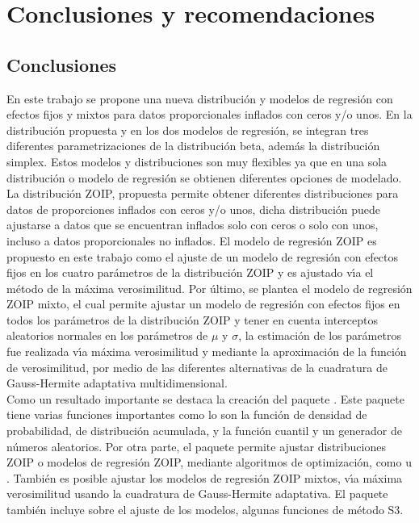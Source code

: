\chapter{Conclusiones y recomendaciones}\label{cap5}
\section{Conclusiones}

En este trabajo se propone una nueva distribuci\'{o}n y modelos de regresi\'{o}n con efectos fijos y mixtos para datos proporcionales inflados con ceros y/o unos. En la distribuci\'{o}n propuesta y en los dos modelos de regresi\'{o}n, se integran tres diferentes parametrizaciones de la distribuci\'{o}n beta, adem\'{a}s la distribuci\'{o}n simplex. Estos modelos y distribuciones son muy flexibles ya que en una sola distribuci\'{o}n o modelo de regresi\'{o}n se obtienen diferentes opciones de modelado.\\

La distribuci\'{o}n ZOIP, propuesta permite obtener diferentes distribuciones para datos de proporciones inflados con ceros y/o unos, dicha distribuci\'{o}n puede ajustarse a datos que se encuentran inflados solo con ceros o solo con unos, incluso a datos proporcionales no inflados. El modelo de regresi\'{o}n ZOIP es propuesto en este trabajo como el ajuste de un modelo de regresi\'{o}n con efectos fijos en los cuatro par\'{a}metros de la distribuci\'{o}n ZOIP y es ajustado v\'{\i}a el m\'{e}todo de la m\'{a}xima verosimilitud. Por \'{u}ltimo, se plantea el modelo de regresi\'{o}n ZOIP mixto, el cual permite ajustar un modelo de regresi\'{o}n con efectos fijos en todos los par\'{a}metros de la distribuci\'{o}n ZOIP y tener en cuenta interceptos aleatorios normales en los par\'{a}metros de $\mu$ y $\sigma$, la estimaci\'{o}n de los par\'{a}metros fue realizada v\'{\i}a m\'{a}xima verosimilitud y mediante la aproximaci\'{o}n de la funci\'{o}n de verosimilitud, por medio de las diferentes alternativas de la cuadratura de Gauss-Hermite adaptativa multidimensional.\\
 
Como un resultado importante se destaca la creaci\'{o}n del paquete . Este paquete tiene varias funciones importantes como lo son la funci\'{o}n de densidad de probabilidad, de distribuci\'{o}n acumulada, y la funci\'{o}n cuantil y un generador de n\'{u}meros aleatorios. Por otra parte, el paquete permite ajustar distribuciones ZOIP o modelos de regresi\'{o}n ZOIP, mediante algoritmos de optimizaci\'{o}n, como  u . Tambi\'{e}n es posible ajustar los modelos de regresi\'{o}n ZOIP mixtos, v\'{\i}a m\'{a}xima verosimilitud usando la cuadratura de Gauss-Hermite adaptativa. El paquete  tambi\'{e}n incluye sobre el ajuste de los modelos, algunas funciones de m\'{e}todo S3.\\

